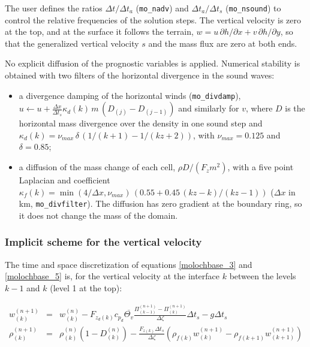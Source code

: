 The user defines the ratios $\Delta t/\Delta t_a$ (\texttt{mo\_nadv}) and
$\Delta t_a/\Delta t_s$ (\texttt{mo\_nsound}) to control the relative
frequencies of the solution steps. The vertical velocity is zero at the top,
and at the surface it follows the terrain,
$w = u\,\partial h/\partial x + v\,\partial h/\partial y$, so that the
generalized vertical velocity $s$ and the mass flux are zero at both ends.

No explicit diffusion of the prognostic variables is applied. Numerical
stability is obtained with two filters of the horizontal divergence in the
sound waves:

\begin{itemize}
  \item a divergence damping of the horizontal winds (\texttt{mo\_divdamp}),
    $u \leftarrow u + \frac{\Delta x}{\Delta t_s} \kappa_d(k)\, m\,
    (D_{(j)} - D_{(j-1)})$ and similarly for $v$, where $D$ is the
    horizontal mass divergence over the density in one sound step and
    $\kappa_d(k) = \nu_{max}\,\delta\,(1/(k+1) - 1/(kz+2))$, with
    $\nu_{max} = 0.125$ and $\delta = 0.85$;
  \item a diffusion of the mass change of each cell, $\rho D / (F_z m^2)$,
    with a five point Laplacian and coefficient
    $\kappa_f(k) = \min(4/\Delta x, \nu_{max})\,(0.55 + 0.45\,(kz-k)/(kz-1))$
    ($\Delta x$ in km, \texttt{mo\_divfilter}). The diffusion has zero
    gradient at the boundary ring, so it does not change the mass of the
    domain.
\end{itemize}

\subsubsection{Implicit scheme for the vertical velocity}
\label{implicitscheme}

The time and space discretization of equations \ref{molochbase_3} and
\ref{molochbase_5} is, for the vertical velocity at the interface $k$ between
the levels $k-1$ and $k$ (level 1 at the top):

\begin{eqnarray}
  \label{impli1}
  w^{(n+1)}_{(k)} &=& w^{(n)}_{(k)} - F_{z_d(k)}c_{p_d}\overline{\Theta_v}
      \frac{\Pi^{(n+1)}_{(k-1)} - \Pi^{(n+1)}_{(k)}}{\Delta \zeta}
      \Delta t_{s} - g \Delta t_{s} \\
  \label{impli2}
  \rho^{(n+1)}_{(k)} &=& \rho^{(n)}_{(k)} \left( 1 - D^{(n)}_{(k)} \right) -
      \frac{F_{z (k)} \Delta t_{s}}{\Delta \zeta} \left(
      \rho_{f(k)} w^{(n+1)}_{(k)} - \rho_{f(k+1)} w^{(n+1)}_{(k+1)} \right)
\end{eqnarray}

